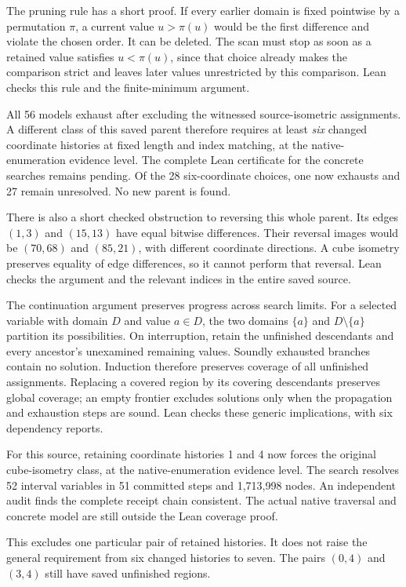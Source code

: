 \documentclass[11pt,a4paper]{article}
\begin{document}
The pruning rule has a short proof. If every earlier domain is
fixed pointwise by a permutation $\pi$, a current value
$u>\pi(u)$ would be the first difference and violate the chosen
order. It can be deleted. The scan must stop as soon as a retained
value satisfies $u<\pi(u)$, since that choice already makes the
comparison strict and leaves later values unrestricted by this
comparison. Lean checks this rule and the finite-minimum argument.

All 56 models exhaust after excluding the witnessed source-isometric
assignments. A different class of this saved parent therefore requires
at least \emph{six} changed coordinate histories at fixed length and
index matching, at the native-enumeration evidence level. The complete
Lean certificate for the concrete searches remains pending. Of the 28
six-coordinate choices, one now exhausts and 27 remain unresolved.
No new parent is found.

There is also a short checked obstruction to reversing this whole
parent. Its edges $(1,3)$ and $(15,13)$ have equal bitwise differences.
Their reversal images would be $(70,68)$ and $(85,21)$, with different
coordinate directions. A cube isometry preserves equality of edge
differences, so it cannot perform that reversal. Lean checks the
argument and the relevant indices in the entire saved source.

The continuation argument preserves progress across search limits.
For a selected variable with domain $D$ and value $a\in D$, the two
domains $\{a\}$ and $D\setminus\{a\}$ partition its possibilities.
On interruption, retain the unfinished descendants and every ancestor's
unexamined remaining values. Soundly exhausted branches contain no
solution. Induction therefore preserves coverage of all unfinished
assignments. Replacing a covered region by its covering descendants
preserves global coverage; an empty frontier excludes solutions only
when the propagation and exhaustion steps are sound. Lean checks
these generic implications, with six dependency reports.

For this source, retaining coordinate histories 1 and 4 now forces
the original cube-isometry class, at the native-enumeration evidence
level. The search resolves 52 interval variables in 51 committed
steps and 1,713,998 nodes. An independent audit finds the complete
receipt chain consistent. The actual native traversal and concrete
model are still outside the Lean coverage proof.

This excludes one particular pair of retained histories. It does not
raise the general requirement from six changed histories to seven.
The pairs $(0,4)$ and $(3,4)$ still have saved unfinished regions.
\end{document}
